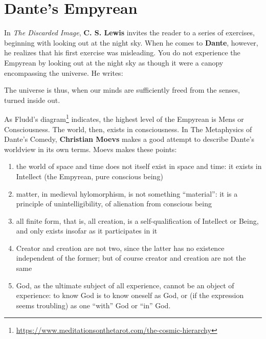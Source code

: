 \section{Dante’s Empyrean}

In \textit{The Discarded Image}, \textbf{C. S. Lewis} invites the reader to a series of exercises, beginning with looking out at the night sky. When he comes to \textbf{Dante}, however, he realizes that his first exercise was misleading. You do not experience the Empyrean by looking out at the night sky as though it were a canopy encompassing the universe. He writes:

\begin{quotex}
The universe is thus, when our minds are sufficiently freed from the senses, turned inside out.
\end{quotex}


As Fludd's diagram\footnote{\url{https://www.meditationsonthetarot.com/the-cosmic-hierarchy}} indicates, the highest level of the Empyrean is Mens or Consciousness. The world, then, exists in consciousness. In The Metaphysics of Dante's Comedy, \textbf{Christian Moevs} makes a good attempt to describe Dante's worldview in its own terms. Moevs makes these points:

\begin{quotex}
\begin{enumerate}
\item the world of space and time does not itself exist in space and time: it exists in Intellect (the Empyrean, pure conscious being)

\item matter, in medieval hylomorphism, is not something ``material'': it is a principle of unintelligibility, of alienation from conscious being

\item all finite form, that is, all creation, is a self-qualification of Intellect or Being, and only exists insofar as it participates in it

\item Creator and creation are not two, since the latter has no existence independent of the former; but of course creator and creation are not the same

\item God, as the ultimate subject of all experience, cannot be an object of experience: to know God is to know oneself as God, or (if the expression seems troubling) as one ``with'' God or ``in'' God.
\end{enumerate}
\end{quotex}

